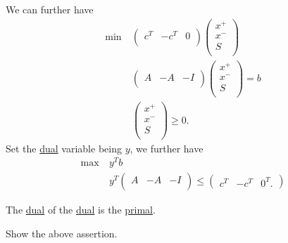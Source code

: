 \begin{explanation}
	We can further have
	\begin{align*}
		\min~ & \begin{pmatrix}
			        c^{T} & -c^{T} & 0 \\
		        \end{pmatrix}\begin{pmatrix}
			                     x^+ \\
			                     x^- \\
			                     S   \\
		                     \end{pmatrix}    \\
		      & \begin{pmatrix}
			        A & -A & -I \\
		        \end{pmatrix}\begin{pmatrix}
			                     x^+ \\
			                     x^- \\
			                     S   \\
		                     \end{pmatrix} = b \\
		      & \begin{pmatrix}
			        x^+ \\
			        x^- \\
			        S   \\
		        \end{pmatrix}\geq 0.
	\end{align*}
	Set the \hyperref[def:dual]{dual} variable being \(y\), we further have
	\begin{align*}
		\max~ & y^{T}b                                           \\
		      & y^{T} \begin{pmatrix}
			              A & -A & -I \\
		              \end{pmatrix} \leq \begin{pmatrix}
			                                 c^{T} & -c^{T} & 0^{T}.
		                                 \end{pmatrix}
	\end{align*}
\end{explanation}

\begin{note}
	The \hyperref[def:dual]{dual} of the \hyperref[def:dual]{dual} is the \hyperref[def:primal]{primal}.
\end{note}
\begin{exercise}
	Show the above assertion.
\end{exercise}